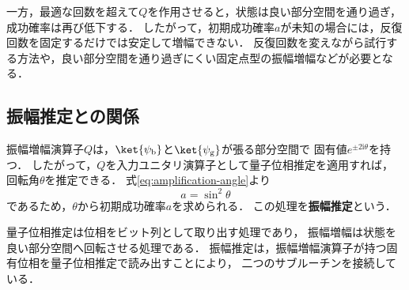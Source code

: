 一方，最適な回数を超えて$Q$を作用させると，状態は良い部分空間を通り過ぎ，
成功確率は再び低下する．
したがって，初期成功確率$a$が未知の場合には，反復回数を固定するだけでは安定して増幅できない．
反復回数を変えながら試行する方法や，良い部分空間を通り過ぎにくい固定点型の振幅増幅などが必要となる．

\subsection{振幅推定との関係}
\label{subsec:relation-to-amplitude-estimation}

振幅増幅演算子$Q$は，$\ket{\psi_{\mathrm{b}}}$と$\ket{\psi_{\mathrm{g}}}$が張る部分空間で
固有値$e^{\pm2\mathrm{i}\theta}$を持つ．
したがって，$Q$を入力ユニタリ演算子として量子位相推定を適用すれば，
回転角$\theta$を推定できる．
式\eqref{eq:amplification-angle}より
\begin{equation}
  a
  =
  \sin^2\theta
  \label{eq:probability-from-amplification-angle}
\end{equation}
であるため，$\theta$から初期成功確率$a$を求められる．
この処理を\textbf{振幅推定}という\cite{brassard2002}．

量子位相推定は位相をビット列として取り出す処理であり，
振幅増幅は状態を良い部分空間へ回転させる処理である．
振幅推定は，振幅増幅演算子が持つ固有位相を量子位相推定で読み出すことにより，
二つのサブルーチンを接続している．
